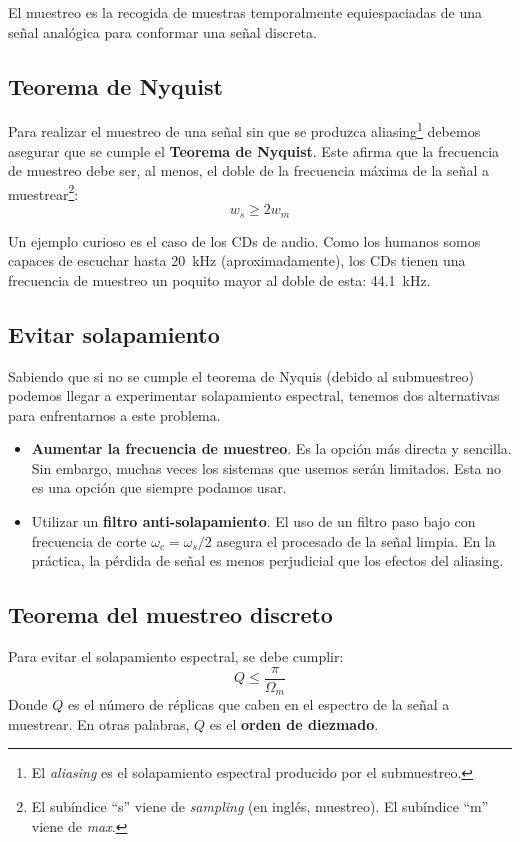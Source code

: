 \documentclass[a4paper,oneside]{book}
\begin{document}
El muestreo es la recogida de muestras temporalmente equiespaciadas de una señal analógica para conformar una señal discreta.

\subsection{Teorema de Nyquist}

Para realizar el muestreo de una señal sin que se produzca aliasing\footnote{El \textit{aliasing} es el solapamiento espectral producido por el submuestreo.} debemos asegurar que se cumple el \textbf{Teorema de Nyquist}. Este afirma que la frecuencia de muestreo debe ser, al menos, el doble de la frecuencia máxima de la señal a muestrear\footnote{El subíndice ``s'' viene de \textit{sampling} (en inglés, muestreo). El subíndice ``m'' viene de \textit{max}.}:
\[ w_s \geq 2w_m \]

Un ejemplo curioso es el caso de los CDs de audio. Como los humanos somos capaces de escuchar hasta \SI{20}{\kHz} (aproximadamente), los CDs tienen una frecuencia de muestreo un poquito mayor al doble de esta: \SI{44.1}{\kHz}.

\subsection{Evitar solapamiento}

Sabiendo que si no se cumple el teorema de Nyquis (debido al submuestreo) podemos llegar a experimentar solapamiento espectral, tenemos dos alternativas para enfrentarnos a este problema.
\begin{itemize}
	\item \textbf{Aumentar la frecuencia de muestreo}. Es la opción más directa y sencilla. Sin embargo, muchas veces los sistemas que usemos serán limitados. Esta no es una opción que siempre podamos usar.
	\item Utilizar un \textbf{filtro anti-solapamiento}. El uso de un filtro paso bajo con frecuencia de corte $\omega_c = \omega_s/2$ asegura el procesado de la señal limpia. En la práctica, la pérdida de señal es menos perjudicial que los efectos del aliasing.
\end{itemize}

\subsection{Teorema del muestreo discreto}

Para evitar el solapamiento espectral, se debe cumplir: \[ Q \leq \frac{\pi}{\Omega_m}\]
Donde $Q$ es el número de réplicas que caben en el espectro de la señal a muestrear. En otras palabras, $Q$ es el \textbf{orden de diezmado}.
\end{document}

